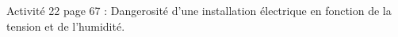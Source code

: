 \begin{myact}{}
	Activité 22 page 67 : Dangerosité d'une installation électrique en fonction de la tension et de l'humidité.
\end{myact}